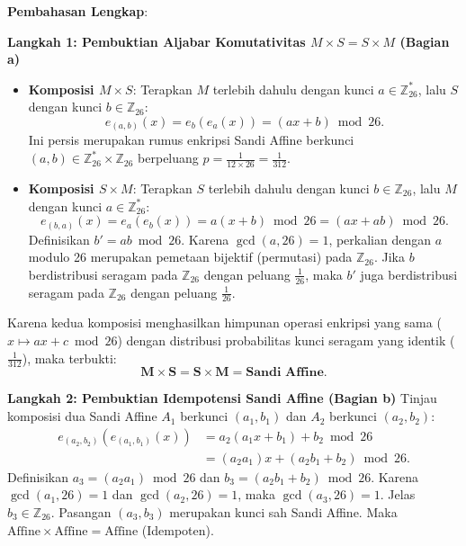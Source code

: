\documentclass[11pt,a4paper]{article}
\begin{document}
\noindent\textbf{Pembahasan Lengkap}:

\noindent\textbf{Langkah 1: Pembuktian Aljabar Komutativitas $M \times S = S \times M$ (Bagian a)}
\begin{itemize}
    \item \textbf{Komposisi $M \times S$}: Terapkan $M$ terlebih dahulu dengan kunci $a \in \mathbb{Z}_{26}^*$, lalu $S$ dengan kunci $b \in \mathbb{Z}_{26}$:
    \[
    e_{(a, b)}(x) = e_b(e_a(x)) = (ax + b) \bmod 26.
    \]
    Ini persis merupakan rumus enkripsi Sandi Affine berkunci $(a, b) \in \mathbb{Z}_{26}^* \times \mathbb{Z}_{26}$ berpeluang $p = \frac{1}{12 \times 26} = \frac{1}{312}$.
    \item \textbf{Komposisi $S \times M$}: Terapkan $S$ terlebih dahulu dengan kunci $b \in \mathbb{Z}_{26}$, lalu $M$ dengan kunci $a \in \mathbb{Z}_{26}^*$:
    \[
    e_{(b, a)}(x) = e_a(e_b(x)) = a(x + b) \bmod 26 = (ax + ab) \bmod 26.
    \]
    Definisikan $b' = ab \bmod 26$. Karena $\gcd(a, 26) = 1$, perkalian dengan $a$ modulo 26 merupakan pemetaan bijektif (permutasi) pada $\mathbb{Z}_{26}$.
    Jika $b$ berdistribusi seragam pada $\mathbb{Z}_{26}$ dengan peluang $\frac{1}{26}$, maka $b'$ juga berdistribusi seragam pada $\mathbb{Z}_{26}$ dengan peluang $\frac{1}{26}$.
\end{itemize}
Karena kedua komposisi menghasilkan himpunan operasi enkripsi yang sama ($x \mapsto ax + c \bmod 26$) dengan distribusi probabilitas kunci seragam yang identik ($\frac{1}{312}$), maka terbukti:
\[
\mathbf{M \times S = S \times M = \text{Sandi Affine}}.
\]

\noindent\textbf{Langkah 2: Pembuktian Idempotensi Sandi Affine (Bagian b)}
Tinjau komposisi dua Sandi Affine $A_1$ berkunci $(a_1, b_1)$ dan $A_2$ berkunci $(a_2, b_2)$:
\begin{align*}
e_{(a_2, b_2)}(e_{(a_1, b_1)}(x)) &= a_2(a_1 x + b_1) + b_2 \bmod 26 \\
&= (a_2 a_1)x + (a_2 b_1 + b_2) \bmod 26.
\end{align*}
Definisikan $a_3 = (a_2 a_1) \bmod 26$ dan $b_3 = (a_2 b_1 + b_2) \bmod 26$.
Karena $\gcd(a_1, 26) = 1$ dan $\gcd(a_2, 26) = 1$, maka $\gcd(a_3, 26) = 1$. Jelas $b_3 \in \mathbb{Z}_{26}$.
Pasangan $(a_3, b_3)$ merupakan kunci sah Sandi Affine. Maka $\text{Affine} \times \text{Affine} = \text{Affine}$ (Idempoten).
\end{document}
